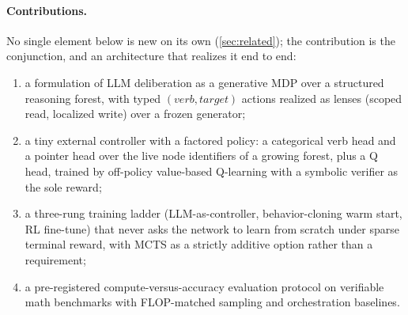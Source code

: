 \paragraph{Contributions.} No single element below is new on its own
(\cref{sec:related}); the contribution is the conjunction, and an
architecture that realizes it end to end:
\begin{enumerate}[leftmargin=1.5em, itemsep=0pt]
\item a formulation of LLM deliberation as a generative MDP over a
  structured reasoning forest, with typed $(\textit{verb}, \textit{target})$
  actions realized as lenses (scoped read, localized write) over a frozen
  generator;
\item a tiny external controller with a factored policy: a categorical verb
  head and a pointer head over the live node identifiers of a growing
  forest, plus a Q head, trained by off-policy value-based Q-learning with a
  symbolic verifier as the sole reward;
\item a three-rung training ladder (LLM-as-controller, behavior-cloning
  warm start, RL fine-tune) that never asks the network to learn from
  scratch under sparse terminal reward, with MCTS as a strictly additive
  option rather than a requirement;
\item a pre-registered compute-versus-accuracy evaluation protocol on
  verifiable math benchmarks with FLOP-matched sampling and orchestration
  baselines. 
\end{enumerate}
